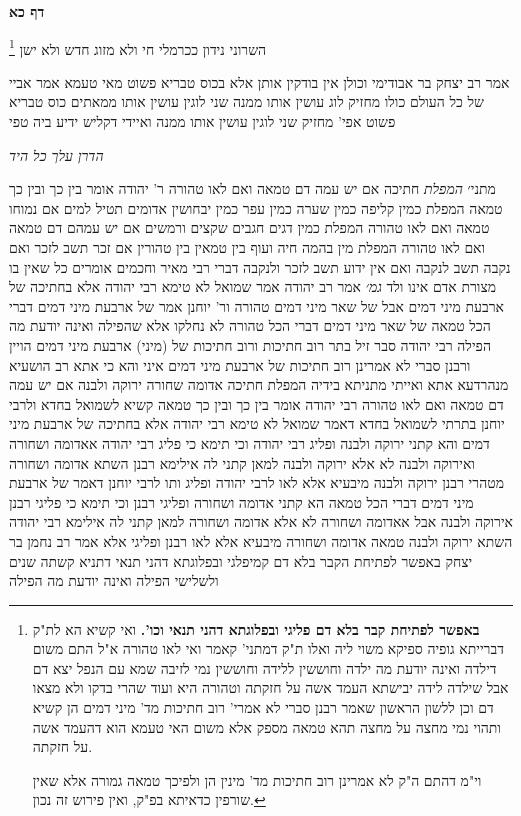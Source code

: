 \documentclass[12pt, openany]{book}
\newcommand{\sethebfont}{
\fontsize{10.5pt}{21.0pt} \selectfont
}
\newcommand{\twocol}[1]{
	{\sethebfont \begin{multicols}{2}
			#1
	\end{multicols}}	
}
\newcommand{\sectname}{}
\newcommand{\newsection}[1]{
	\addcontentsline{toc}{section}{#1}
	\renewcommand{\sectname}{#1}	
	\vspace{-\baselineskip}
	\begin{center}
		\textbf{%
\fontsize{16pt}{16pt}\selectfont
			#1}
	\end{center}
	\vspace{-\baselineskip}
	\nopagebreak
}
\newcommand{\footnotecomment}[1]{\footnote{#1}}
\newcommand{\commenta}[1]{\footnotecomment{#1}}
\begin{document}
\newsection{דף כא}
\twocol{השרוני נידון ככרמלי חי ולא מזוג חדש ולא ישן 
\commenta{\textbf{באפשר לפתיחת קבר בלא דם פליגי ובפלוגתא דהני תנאי וכו'.}  ואי קשיא הא לת"ק דברייתא גופיה ספיקא משוי ליה ואלו ת"ק דמתני' קאמר ואי לאו טהורה א"ל התם משום דילדה ואינה יודעת מה ילדה וחוששין ללידה וחוששין נמי לזיבה שמא עם הנפל יצא דם אבל שילדה לידה יבישתא העמד אשה על חזקתה וטהורה היא ועוד שהרי בדקו ולא מצאו דם וכן ללשון הראשון שאמר רבנן סברי לא אמרי' רוב חתיכות מד' מיני דמים הן קשיא ותהוי נמי מחצה על מחצה תהא טמאה מספק אלא משום האי טעמא הוא דהעמד אשה על חזקתה.\par וי"מ דהתם ה"ק לא אמרינן רוב חתיכות מד' מינין הן ולפיכך טמאה גמורה אלא שאין שורפין כדאיתא בפ"ק, ואין פירוש זה נכון. }

אמר רב יצחק בר אבודימי  וכולן אין בודקין אותן אלא בכוס טבריא  פשוט  מאי טעמא  אמר אביי  של כל העולם כולו מחזיק לוג עושין אותו ממנה שני לוגין עושין אותו ממאתים  כוס טבריא פשוט אפי' מחזיק שני לוגין עושין אותו ממנה ואיידי דקליש ידיע ביה טפי
\par \par {\large\emph{הדרן עלך כל היד}}\par \par 
מתני׳ {\large\emph{המפלת}} חתיכה אם יש עמה דם טמאה ואם לאו טהורה ר' יהודה אומר  בין כך ובין כך טמאה 
המפלת כמין קליפה כמין שערה כמין עפר כמין יבחושין אדומים תטיל למים אם נמוחו טמאה ואם לאו טהורה 
המפלת כמין דגים חגבים שקצים ורמשים אם יש עמהם דם טמאה ואם לאו טהורה 
המפלת מין בהמה חיה ועוף בין טמאין בין טהורין אם זכר תשב לזכר ואם נקבה תשב לנקבה
ואם אין ידוע תשב לזכר ולנקבה דברי רבי מאיר  וחכמים אומרים  כל שאין בו מצורת אדם אינו ולד
{\large\emph{גמ׳}} אמר רב יהודה אמר שמואל לא טימא רבי יהודה אלא בחתיכה של ארבעת מיני דמים אבל של שאר מיני דמים טהורה 
ור' יוחנן אמר  של ארבעת מיני דמים דברי הכל טמאה של שאר מיני דמים דברי הכל טהורה 
לא נחלקו אלא שהפילה ואינה יודעת מה הפילה  רבי יהודה סבר  זיל בתר רוב חתיכות ורוב חתיכות של (מיני) ארבעת מיני דמים הויין  ורבנן סברי  לא אמרינן רוב חתיכות של ארבעת מיני דמים 
איני והא כי אתא רב הושעיא מנהרדעא אתא ואייתי מתניתא בידיה  המפלת חתיכה אדומה שחורה ירוקה ולבנה אם יש עמה דם טמאה ואם לאו טהורה  רבי יהודה אומר  בין כך ובין כך טמאה קשיא לשמואל בחדא ולרבי יוחנן בתרתי 
לשמואל בחדא דאמר שמואל  לא טימא רבי יהודה אלא בחתיכה של ארבעת מיני דמים והא קתני ירוקה ולבנה ופליג רבי יהודה 
וכי תימא  כי פליג רבי יהודה אאדומה ושחורה ואירוקה ולבנה לא אלא ירוקה ולבנה למאן קתני לה 
אילימא רבנן השתא אדומה ושחורה מטהרי רבנן ירוקה ולבנה מיבעיא  אלא לאו לרבי יהודה ופליג 
ותו לרבי יוחנן דאמר  של ארבעת מיני דמים דברי הכל טמאה הא קתני אדומה ושחורה ופליגי רבנן 
וכי תימא  כי פליגי רבנן אירוקה ולבנה אבל אאדומה ושחורה לא אלא אדומה ושחורה למאן קתני לה 
אילימא רבי יהודה השתא ירוקה ולבנה טמאה אדומה ושחורה מיבעיא  אלא לאו רבנן ופליגי 
אלא אמר רב נחמן בר יצחק  באפשר לפתיחת הקבר בלא דם קמיפלגי ובפלוגתא דהני תנאי דתניא  קשתה שנים ולשלישי הפילה ואינה יודעת מה הפילה}
\end{document}
